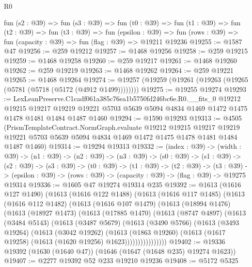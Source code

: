 \begin{lexlean}{R0}
\begin{coremodule}
  fun (s2 : @39) =>
  fun (s3 : @39) =>
  fun (t0 : @39) =>
  fun (t1 : @39) =>
  fun (t2 : @39) =>
  fun (t3 : @39) =>
  fun (epsilon : @39) =>
  fun (rows : @39) => fun (capacity : @39) => fun (flag : @39) => @19211 @19236
@19255 := @1587 @47
@19256 := @259 @19212
@19257 := @1468 @19256
@19258 := @259 @19215
@19259 := @1468 @19258
@19260 := @259 @19217
@19261 := @1468 @19260
@19262 := @259 @19219
@19263 := @1468 @19262
@19264 := @259 @19221
@19265 := @1468 @19264
@19274 := @19257 (@19259 (@19261 (@19263 (@19265 (@5781 (@5718 (@5172 (@4912 @1499))))))))
@19275 := @19255 @19274
@19293 := LexLeanPreserve.C1cadf061a385c76ea1b5750fd246bc6e.R0.__fits_0
    @19212
    @19215
    @19217
    @19219
    @19221
    @5703
    @5639
    @5094
    @4834
    @1469
    @1472
    @1475
    @1478
    @1481
    @1484
    @1487
    @1460
@19294 := @1590 @19293
@19313 := @4505
    (PrismTemplateContract.NormGraph.evaluate
      @19212
      @19215
      @19217
      @19219
      @19221
      @5703
      @5639
      @5094
      @4834
      @1469
      @1472
      @1475
      @1478
      @1481
      @1484
      @1487
      @1460)
@19314 := @19294 @19313
@19332 := (index : @39) ->
  (width : @39) ->
  (n1 : @39) ->
  (n2 : @39) ->
  (n3 : @39) ->
  (s0 : @39) ->
  (s1 : @39) ->
  (s2 : @39) ->
  (s3 : @39) ->
  (t0 : @39) ->
  (t1 : @39) ->
  (t2 : @39) ->
  (t3 : @39) -> (epsilon : @39) -> (rows : @39) -> (capacity : @39) -> (flag : @39) -> @19275 @19314
@19336 := @1605 @47 @19274 @19314 @235
@19392 := @1613
    (@1616 @127 @1490)
    (@1613
      (@1616 @122 @1488)
      (@1613
        (@1616 @117 @1485)
        (@1613
          (@1616 @112 @1482)
          (@1613
            (@1616 @107 @1479)
            (@1613
              (@18994 @1476)
              (@1613
                (@18927 @1473)
                (@1613
                  (@17885 @1470)
                  (@1613
                    (@8747 @4897)
                    (@1613
                      (@3484 @5143)
                      (@1613
                        (@3487 @5679)
                        (@1613
                          (@3490 @5766)
                          (@1613
                            (@3493 @19264)
                            (@1613
                              (@3042 @19262)
                              (@1613
                                (@1863 @19260)
                                (@1613 (@1617 @19258) (@1613 (@1620 @19256) @1623))))))))))))))))
@19402 := @19336 @19392 (@1630 (@1640 @47)) (@1646 (@1647 (@1648 @235) @19274 @1623))
@19407 := @2277 @19392 @52 @233 @19210 @19236
@19408 := @5172 @5325

\end{coremodule}
\end{lexlean}
